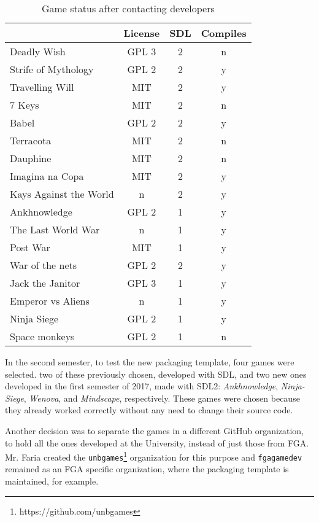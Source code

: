 \begin{table}[h!]
\centering
\caption{Game status after contacting developers}
\label{tab:final_games}
\begin{tabular}{lccc}
\toprule
\textbf{} & \multicolumn{1}{l}{\textbf{License}} & \multicolumn{1}{l}{\textbf{SDL}} & \multicolumn{1}{l}{\textbf{Compiles}} \\
\midrule
Deadly Wish & GPL 3 & 2 & n \\
Strife of Mythology & GPL 2 & 2 & y \\
Travelling Will & MIT & 2 & y \\
7 Keys & MIT & 2 & n \\
Babel & GPL 2 & 2 & y \\
Terracota & MIT & 2 & n \\
Dauphine & MIT & 2 & n \\
Imagina na Copa & MIT & 2 & y \\
Kays Against the World & n & 2 & y \\
Ankhnowledge & GPL 2 & 1 & y \\
The Last World War & n & 1 & y \\
Post War & MIT & 1 & y \\
War of the nets & GPL 2 & 2 & y \\
Jack the Janitor & GPL 3 & 1 & y \\
Emperor vs Aliens & n & 1 & y \\
Ninja Siege & GPL 2 & 1 & y \\
Space monkeys & GPL 2 & 1 & n \\
\bottomrule
\end{tabular}
\end{table}

In the second semester, to test the new packaging template, four games were selected. two of these previously chosen, developed with SDL, and two new ones developed in the first semester of 2017, made with SDL2: \textit{Ankhnowledge}, \textit{Ninja-Siege}, \textit{Wenova}, and \textit{Mindscape}, respectively. These games were chosen because they already worked correctly without any need to change their source code.

Another decision was to separate the games in a different GitHub organization, to hold all the ones developed at the University, instead of just those from FGA. Mr. Faria created the \texttt{unbgames}\footnote{https://github.com/unbgames} organization for this purpose and \texttt{fgagamedev} remained as an FGA specific organization, where the packaging template is maintained, for example.

